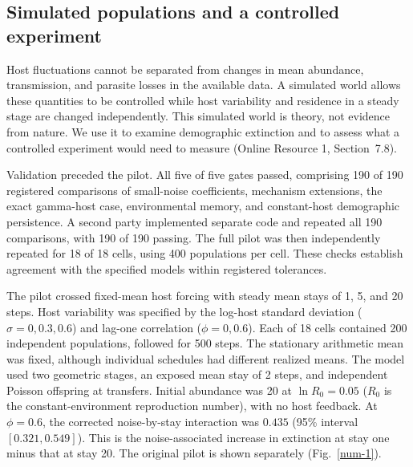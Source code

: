 \subsection{Simulated populations and a controlled experiment}
\label{num-simworld}

Host fluctuations cannot be separated from changes in mean abundance, transmission,
and parasite losses in the available data. A simulated world allows these quantities
to be controlled while host variability and residence in a steady stage are changed
independently. This simulated world is theory, not evidence from nature. We use it
to examine demographic extinction and to assess what a controlled experiment would
need to measure (Online Resource 1, Section~7.8).

Validation preceded the pilot. All five of five gates passed, comprising 190 of 190
registered comparisons of small-noise coefficients, mechanism extensions, the exact
gamma-host case, environmental memory, and constant-host demographic persistence.
A second party implemented separate code and repeated all 190 comparisons, with
190 of 190 passing. The full pilot was then independently repeated for 18 of 18
cells, using 400 populations per cell. These checks establish agreement with the
specified models within registered tolerances.

The pilot crossed fixed-mean host forcing with steady mean stays of 1, 5, and
20 steps. Host variability was specified by the log-host standard deviation
($\sigma=0,0.3,0.6$) and lag-one correlation ($\phi=0,0.6$). Each of 18 cells
contained 200 independent populations, followed for 500 steps. The stationary
arithmetic mean was fixed, although individual schedules had different realized
means. The model used two geometric stages, an exposed mean stay of 2 steps,
and independent Poisson offspring at transfers. Initial abundance was 20
at $\ln R_0=0.05$ ($R_0$ is the constant-environment reproduction number),
with no host feedback. At $\phi=0.6$, the corrected noise-by-stay interaction was
$0.435$ (95\% interval $[0.321,0.549]$). This is the noise-associated increase
in extinction at stay one minus that at stay 20. The original pilot is shown
separately (Fig.~\ref{num-1}).

